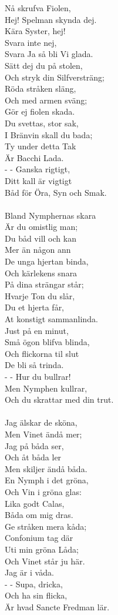 \vspace{10pt}
Nå skrufva Fiolen,\\
Hej! Spelman skynda dej.\\
Kära Syster, hej!\\
Svara inte nej,\\
Svara Ja så bli Vi glada.\\
Sätt dej du på stolen,\\
Och stryk din Silfversträng;\\
Röda stråken släng,\\
Och med armen sväng;\\
Gör ej fiolen skada.\\
Du svettas, stor sak,\\
I Bränvin skall du bada;\\
Ty under detta Tak\\
Är Bacchi Lada.\\
-  -  Ganska rigtigt,\\
Ditt kall är vigtigt\\
Båd för Öra, Syn och Smak.\\
\\
Bland Nymphernas skara\\
Är du omistlig man;\\
Du båd vill och kan\\
Mer än någon ann\\
De unga hjertan binda,\\
Och kärlekens snara\\
På dina strängar står;\\
Hvarje Ton du slår,\\
Du et hjerta får,\\
At konstigt sammanlinda.\\
Just på en minut,\\
Små ögon blifva blinda,\\
Och flickorna til slut\\
De bli så trinda.\\
-  -  Hur du bullrar!\\
Men Nymphen kullrar,\\
Och du skrattar med din trut.\\
\\
Jag älskar de sköna,\\
Men Vinet ändå mer;\\
Jag på båda ser,\\
Och åt båda ler\\
Men skiljer ändå båda.\\
En Nymph i det gröna,\\
Och Vin i gröna glas:\\
Lika godt Calas,\\
Båda om mig dras.\\
Ge stråken mera kåda;\\
Confonium tag där\\
Uti min gröna Låda;\\
Och Vinet står ju här.\\
Jag är i våda.\\
-  -  Supa, dricka,\\
Och ha sin flicka,\\
Är hvad Sancte Fredman lär.
